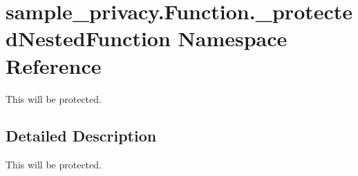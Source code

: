 \hypertarget{namespacesample__privacy_1_1_function_1_1__protected_nested_function}{\section{sample\-\_\-privacy.\-Function.\-\_\-protected\-Nested\-Function Namespace Reference}
\label{namespacesample__privacy_1_1_function_1_1__protected_nested_function}
}


This will be protected.  




\subsection{Detailed Description}
This will be protected. 